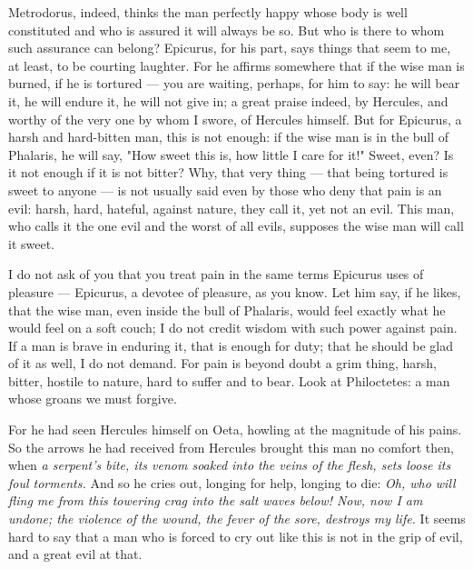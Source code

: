  Metrodorus, indeed, thinks the man perfectly happy whose body is well constituted and who is assured it will always be so. But who is there to whom such assurance can belong? Epicurus, for his part, says things that seem to me, at least, to be courting laughter. For he affirms somewhere that if the wise man is burned, if he is tortured — you are waiting, perhaps, for him to say: he will bear it, he will endure it, he will not give in; a great praise indeed, by Hercules, and worthy of the very one by whom I swore, of Hercules himself. But for Epicurus, a harsh and hard-bitten man, this is not enough: if the wise man is in the bull of Phalaris, he will say, "How sweet this is, how little I care for it!" Sweet, even? Is it not enough if it is not bitter? Why, that very thing — that being tortured is sweet to anyone — is not usually said even by those who deny that pain is an evil: harsh, hard, hateful, against nature, they call it, yet not an evil. This man, who calls it the one evil and the worst of all evils, supposes the wise man will call it sweet.

 I do not ask of you that you treat pain in the same terms Epicurus uses of pleasure — Epicurus, a devotee of pleasure, as you know. Let him say, if he likes, that the wise man, even inside the bull of Phalaris, would feel exactly what he would feel on a soft couch; I do not credit wisdom with such power against pain. If a man is brave in enduring it, that is enough for duty; that he should be glad of it as well, I do not demand. For pain is beyond doubt a grim thing, harsh, bitter, hostile to nature, hard to suffer and to bear. Look at Philoctetes: a man whose groans we must forgive.

 For he had seen Hercules himself on Oeta, howling at the magnitude of his pains. So the arrows he had received from Hercules brought this man no comfort then, when \textit{a serpent's bite, its venom soaked into the veins of the flesh, sets loose its foul torments.} And so he cries out, longing for help, longing to die: \textit{Oh, who will fling me from this towering crag into the salt waves below! Now, now I am undone; the violence of the wound, the fever of the sore, destroys my life.} It seems hard to say that a man who is forced to cry out like this is not in the grip of evil, and a great evil at that.

